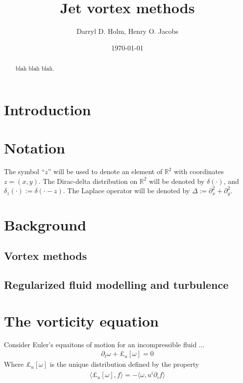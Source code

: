 \documentclass[12pt]{amsart}
\title{Jet vortex methods}
\author{Darryl D. Holm, Henry O. Jacobs}
\date{\today}
\begin{document}
\maketitle

\begin{abstract}
  blah blah blah.
\end{abstract}

\section{Introduction}
\label{sec:intro}


\section{Notation}
The symbol ``$z$'' will be used to denote
an element of $\mathbb{R}^2$
with coordinates $z = (x,y)$.
The Dirac-delta distribution on $\mathbb{R}^2$
will be denoted by $\delta(\cdot)$, and $\delta_z(\cdot) := \delta( \cdot - z)$.
The Laplace operator will be denoted by $\Delta := \partial_x^2 + \partial_y^2$.

\section{Background}

\subsection{Vortex methods}

\subsection{Regularized fluid modelling and turbulence}


\section{The vorticity equation}
\label{sec:vorticity}
Consider Euler's equaitons of motion for an incompressible fluid
...
\begin{align*}
  \partial_t \omega + \pounds_u [\omega] = 0
\end{align*}
Where $\pounds_u[\omega]$ is the unique distribution defined by the property
\begin{align*}
  \langle \pounds_u[\omega] , f \rangle = - \langle \omega , u^i \partial_i f \rangle
\end{align*}
\end{document}
